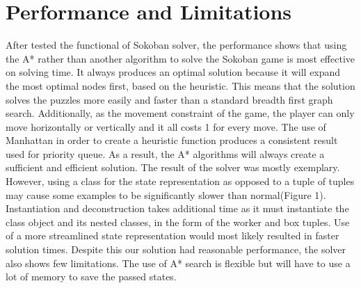 \documentclass[a4paper,12pt]{article}
\begin{document}
\section{Performance and Limitations}

After tested the functional of Sokoban solver, the performance shows that using the A* rather than another algorithm to solve the Sokoban game is most effective on solving time. It always produces an optimal solution because it will expand the most optimal nodes first, based on the heuristic. This means that the solution solves the puzzles more easily and faster than a standard breadth first graph search. Additionally, as the movement constraint of the game, the player can only move horizontally or vertically and it all costs 1 for every move. The use of Manhattan in order to create a heuristic function produces a consistent result used for priority queue. As a result, the A* algorithms will always create a sufficient and efficient solution. The result of the solver was mostly exemplary. However, using a class for the state representation as opposed to a tuple of tuples may cause some examples to be significantly slower than normal(Figure 1). Instantiation and deconstruction takes additional time as it must instantiate the class object and its nested classes, in the form of the worker and box tuples. Use of a more streamlined state representation would most likely resulted in faster solution times. Despite this our solution had reasonable performance, the solver also shows few limitations. The use of A* search is flexible but will have to use a lot of memory to save the passed states. 
\end{document}
